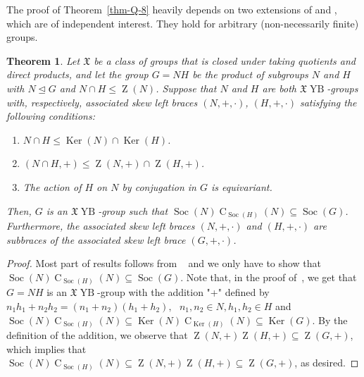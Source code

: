 \documentclass[12pt,a4paper]{article}
\DeclareMathOperator{\C}{C}
\DeclareMathOperator{\Soc}{Soc}
\DeclareMathOperator{\Z}{Z}
\DeclareMathOperator{\Ker}{Ker}
\DeclareMathOperator{\YB}{YB}
\newtheorem{theorem}{Theorem}
\theoremstyle{definition}
\begin{document}
The proof of Theorem~\ref{thm-Q-8}
heavily depends on two extensions of \cite[Theorem~A]{MengBallesterEstebanFuster2021} and \cite[Theorem~A]{BEJP2023}, which are  of independent interest. They hold for arbitrary (non-necessarily finite) groups.


\begin{theorem}\label{tA}
Let $\mathfrak{X}$ be a class of groups that is closed under taking quotients and direct products, and let the group $G = NH$ be the product of subgroups $N$ and $H$ with $N \trianglelefteq G$ and $N \cap H \leq \Z(N)$. Suppose that $N$ and $H$ are both $\mathfrak{X}\YB$-groups with, respectively, associated skew left braces $(N,+, \cdot)$, $(H,+, \cdot)$ satisfying the following conditions:

\begin{enumerate}
    \item $N \cap H \leq \operatorname{Ker}(N) \cap \operatorname{Ker}(H)$.
    \item $(N \cap H, +) \leq \Z(N, +) \cap \Z(H, +)$.
    \item The action of $H$ on $N$ by conjugation in $G$ is equivariant.
\end{enumerate}
Then, $G$ is an $\mathfrak{X}\YB$-group such that $\operatorname{Soc}(N) \operatorname{C}_{\operatorname{Soc}(H)}(N) \subseteq\operatorname{Soc}(G)$. Furthermore, the associated skew left braces $(N,+, \cdot)$ and $(H,+, \cdot)$ are subbraces of the associated skew left brace $(G,+, \cdot)$.
\end{theorem}

\begin{proof}
Most part of results follows from ~\cite[Theorem~A]{BEJP2023} and we only have to show that $\Soc(N)\C_{\Soc(H)}(N) \subseteq \Soc(G)$.
Note that, in the proof of~\cite[Theorem~A]{BEJP2023}, we get that $G=NH$ is an $\mathfrak{X}\YB$-group with the addition "+" defined by
$n_1h_1+n_2h_2=(n_1+n_2)(h_1+h_2),~~~n_1,n_2 \in N, h_1,h_2 \in H$
and  $\Soc(N)\C_{\Soc(H)}(N) \subseteq \Ker(N) \C_{\Ker(H)}(N) \subseteq \Ker(G)$.  By the definition of the addition, we observe that $\Z(N,+)\Z(H,+) \subseteq \Z(G,+)$, which implies that $\Soc(N)\C_{\Soc(H)}(N) \subseteq \Z(N,+)\Z(H,+) \subseteq \Z(G,+)$, as desired.
\end{proof}
\end{document}
